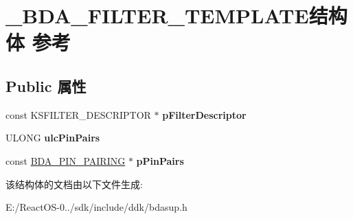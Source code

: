 \hypertarget{struct___b_d_a___f_i_l_t_e_r___t_e_m_p_l_a_t_e}{}\section{\+\_\+\+B\+D\+A\+\_\+\+F\+I\+L\+T\+E\+R\+\_\+\+T\+E\+M\+P\+L\+A\+T\+E结构体 参考}
\label{struct___b_d_a___f_i_l_t_e_r___t_e_m_p_l_a_t_e}
\subsection*{Public 属性}
\begin{DoxyCompactItemize}
\item 
\mbox{\label{struct___b_d_a___f_i_l_t_e_r___t_e_m_p_l_a_t_e_ae19ccc21f3a4678a3e51f10aafe5e071}} 
const K\+S\+F\+I\+L\+T\+E\+R\+\_\+\+D\+E\+S\+C\+R\+I\+P\+T\+OR $\ast$ {\bfseries p\+Filter\+Descriptor}
\item 
\mbox{\label{struct___b_d_a___f_i_l_t_e_r___t_e_m_p_l_a_t_e_a582bf1bf4101b4192559a8e75ad1ee06}} 
U\+L\+O\+NG {\bfseries ulc\+Pin\+Pairs}
\item 
\mbox{\label{struct___b_d_a___f_i_l_t_e_r___t_e_m_p_l_a_t_e_a6547ead065b1d5cfe698d0478ecc5787}} 
const \hyperlink{struct___b_d_a___p_i_n___p_a_i_r_i_n_g}{B\+D\+A\+\_\+\+P\+I\+N\+\_\+\+P\+A\+I\+R\+I\+NG} $\ast$ {\bfseries p\+Pin\+Pairs}
\end{DoxyCompactItemize}


该结构体的文档由以下文件生成\+:\begin{DoxyCompactItemize}
\item 
E\+:/\+React\+O\+S-\/0../sdk/include/ddk/bdasup.\+h\end{DoxyCompactItemize}
